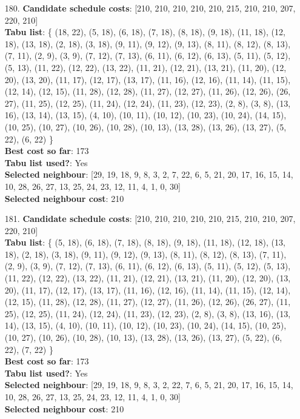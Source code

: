 \documentclass[fleqn]{article}
\begin{document}
\begin{itemize}
    \item[180.] \textbf{Candidate schedule costs}: [210, 210, 210, 210, 210, 215, 210, 210, 207, 220, 210] \\
    \textbf{Tabu list}: \{ (18, 22), (5, 18), (6, 18), (7, 18), (8, 18), (9, 18), (11, 18), (12, 18), (13, 18), (2, 18), (3, 18), (9, 11), (9, 12), (9, 13), (8, 11), (8, 12), (8, 13), (7, 11), (2, 9), (3, 9), (7, 12), (7, 13), (6, 11), (6, 12), (6, 13), (5, 11), (5, 12), (5, 13), (11, 22), (12, 22), (13, 22), (11, 21), (12, 21), (13, 21), (11, 20), (12, 20), (13, 20), (11, 17), (12, 17), (13, 17), (11, 16), (12, 16), (11, 14), (11, 15), (12, 14), (12, 15), (11, 28), (12, 28), (11, 27), (12, 27), (11, 26), (12, 26), (26, 27), (11, 25), (12, 25), (11, 24), (12, 24), (11, 23), (12, 23), (2, 8), (3, 8), (13, 16), (13, 14), (13, 15), (4, 10), (10, 11), (10, 12), (10, 23), (10, 24), (14, 15), (10, 25), (10, 27), (10, 26), (10, 28), (10, 13), (13, 28), (13, 26), (13, 27), (5, 22), (6, 22) \} \\
    \textbf{Best cost so far}: 173 \\
    \textbf{Tabu list used?}: Yes \\
    \textbf{Selected neighbour}: [29, 19, 18, 9, 8, 3, 2, 7, 22, 6, 5, 21, 20, 17, 16, 15, 14, 10, 28, 26, 27, 13, 25, 24, 23, 12, 11, 4, 1, 0, 30] \\
    \textbf{Selected neighbour cost}: 210
      

    \item[181.] \textbf{Candidate schedule costs}: [210, 210, 210, 210, 210, 215, 210, 210, 207, 220, 210] \\
    \textbf{Tabu list}: \{ (5, 18), (6, 18), (7, 18), (8, 18), (9, 18), (11, 18), (12, 18), (13, 18), (2, 18), (3, 18), (9, 11), (9, 12), (9, 13), (8, 11), (8, 12), (8, 13), (7, 11), (2, 9), (3, 9), (7, 12), (7, 13), (6, 11), (6, 12), (6, 13), (5, 11), (5, 12), (5, 13), (11, 22), (12, 22), (13, 22), (11, 21), (12, 21), (13, 21), (11, 20), (12, 20), (13, 20), (11, 17), (12, 17), (13, 17), (11, 16), (12, 16), (11, 14), (11, 15), (12, 14), (12, 15), (11, 28), (12, 28), (11, 27), (12, 27), (11, 26), (12, 26), (26, 27), (11, 25), (12, 25), (11, 24), (12, 24), (11, 23), (12, 23), (2, 8), (3, 8), (13, 16), (13, 14), (13, 15), (4, 10), (10, 11), (10, 12), (10, 23), (10, 24), (14, 15), (10, 25), (10, 27), (10, 26), (10, 28), (10, 13), (13, 28), (13, 26), (13, 27), (5, 22), (6, 22), (7, 22) \} \\
    \textbf{Best cost so far}: 173 \\
    \textbf{Tabu list used?}: Yes \\
    \textbf{Selected neighbour}: [29, 19, 18, 9, 8, 3, 2, 22, 7, 6, 5, 21, 20, 17, 16, 15, 14, 10, 28, 26, 27, 13, 25, 24, 23, 12, 11, 4, 1, 0, 30] \\
    \textbf{Selected neighbour cost}: 210
      


\end{itemize}
\end{document}
